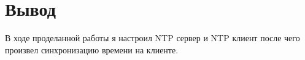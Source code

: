 \chapter{Вывод}
В ходе проделанной работы я настроил NTP сервер и NTP клиент после чего произвел синхронизацию времени на клиенте.